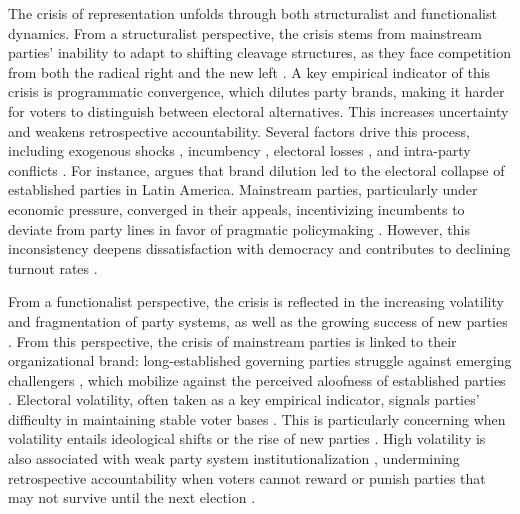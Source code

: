 \documentclass[12pt]{article}
\begin{document}
The crisis of representation unfolds through both structuralist and functionalist dynamics. From a structuralist perspective, the crisis stems from mainstream parties' inability to adapt to shifting cleavage structures, as they face competition from both the radical right and the new left \citep{Hooghe_Marks_2018, Kriesi_et_al_2008, Kriesi_et_al_2012}. A key empirical indicator of this crisis is programmatic convergence, which dilutes party brands, making it harder for voters to distinguish between electoral alternatives. This increases uncertainty and weakens retrospective accountability. Several factors drive this process, including exogenous shocks \citep{Lupu_2016, Hutter_Kriesi_2019}, incumbency \citep{Roberts_2014}, electoral losses \citep{Janda_Harmel_Edens_Goff_1995}, and intra-party conflicts \citep{Pasotti_2010}. For instance, \citet[][]{Lupu_2016} argues that brand dilution led to the electoral collapse of established parties in Latin America. Mainstream parties, particularly under economic pressure, converged in their appeals, incentivizing incumbents to deviate from party lines in favor of pragmatic policymaking \citep[see also:][]{Roberts_2014}. However, this inconsistency deepens dissatisfaction with democracy and contributes to declining turnout rates \citep{Dass_McAll_2020}.

From a functionalist perspective, the crisis is reflected in the increasing volatility and fragmentation of party systems, as well as the growing success of new parties \citep{Bertoa_Enyedi_2021, Dassonneville_2022, Haughton_Deegan_Krause_2020, Engler_2023}. From this perspective, the crisis of mainstream parties is linked to their organizational brand: long-established governing parties struggle against emerging challengers \citep{deVries_Hobolt_2020, Sikk_2011, Haughton_Deegan_Krause_2020}, which mobilize against the perceived aloofness of established parties \citep[][]{Mudde_2007, Van_Kessel_2015}. Electoral volatility, often taken as a key empirical indicator, signals parties' difficulty in maintaining stable voter bases \citep{Dalton_Wattenberg_2000}. This is particularly concerning when volatility entails ideological shifts \citep{Dassonneville_2022} or the rise of new parties \citep{Haughton_Deegan_Krause_2020, Engler_2023}. High volatility is also associated with weak party system institutionalization \citep{Bertoa_Enyedi_2021}, undermining retrospective accountability when voters cannot reward or punish parties that may not survive until the next election \citep{Borbath_2021}.
\end{document}
